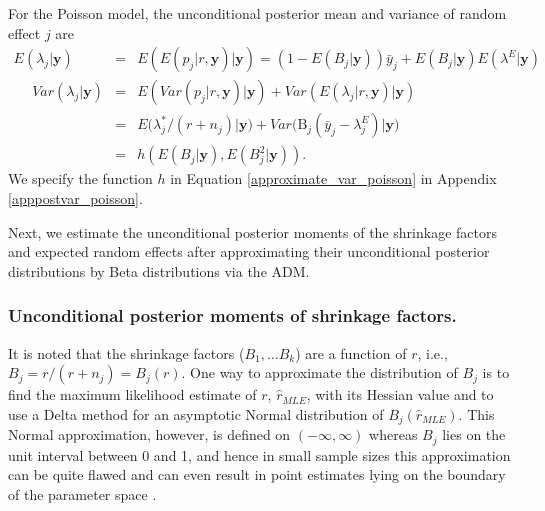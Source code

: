 \documentclass[article]{jss}
\begin{document}
For the Poisson model, the unconditional posterior mean and variance of random effect $j$ are
\begin{eqnarray}
E(\lambda_j\vert \boldsymbol{y}) &=&E(E(p_{j}\vert r, \boldsymbol{y})\vert\boldsymbol{y})=(1-E(B_j\vert\boldsymbol{y}))\bar{y}_j + E(B_j\vert  \boldsymbol{y})E(\lambda^E\vert  \boldsymbol{y})\label{postmean_poisson} \\
~~~~~~Var(\lambda_{j}\vert \boldsymbol{y}) &=&  E(Var(p_{j}\vert r,  \boldsymbol{y})\vert \boldsymbol{y})+Var(E(\lambda_{j}\vert r, \boldsymbol{y})\vert \boldsymbol{y})\label{postvar_poisson}\\
&=& E\big(\lambda^{\ast}_{j}/ (r+n_{j})\vert  \boldsymbol{y}\big)+Var\big(\textrm{B}_{j}(\bar{y}_{j}-\lambda^E_{j})\vert \boldsymbol{y}\big) \\
&=&h(E(B_j\vert\boldsymbol{y}), E(B^2_j\vert\boldsymbol{y}) ).\label{approximate_var_poisson}
\end{eqnarray}
We specify the function $h$ in Equation \ref{approximate_var_poisson} in Appendix \ref{apppostvar_poisson}.

Next, we estimate the unconditional posterior moments of the shrinkage factors and expected random effects after approximating their unconditional posterior distributions by Beta distributions via the ADM. 

\subsubsection{Unconditional posterior moments of shrinkage factors.}  It is noted that  the shrinkage factors ($B_1, \ldots B_k$) are a function of $r$, i.e., $B_{j}= r/(r+n_{j})=B_{j}(r)$. One way to approximate the distribution of $B_{j}$ is to find the maximum likelihood estimate of $r$, $\hat{r}_{MLE}$, with its Hessian value and to use a Delta method for an asymptotic Normal distribution of $B_{j}(\hat{r}_{MLE})$. This Normal approximation, however, is defined on $(-\infty, \infty)$ whereas $B_{j}$ lies on the unit interval between 0 and 1, and hence in small sample sizes this approximation can be quite flawed and can even result in point estimates lying on the boundary of the parameter space \citep{tang2011}.
\end{document}

